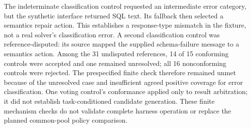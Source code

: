 The indeterminate classification control requested an intermediate error
category, but the synthetic interface returned SQL text. Its fallback then
selected a semantics repair action. This establishes a response-type mismatch
in the fixture, not a real solver's classification error. A second classification
control was reference-disputed: its source mapped the supplied schema-failure
message to a semantics action. Among the 31 undisputed references, 14 of 15
conforming controls were accepted and one remained unresolved; all 16
nonconforming controls were rejected. The prespecified finite check therefore
remained unmet because of the unresolved case and insufficient agreed positive
coverage for error classification. One voting control's conformance applied
only to result arbitration; it did not establish task-conditioned candidate
generation. These finite mechanism checks do not validate complete harness
operation or replace the planned common-pool policy comparison.
